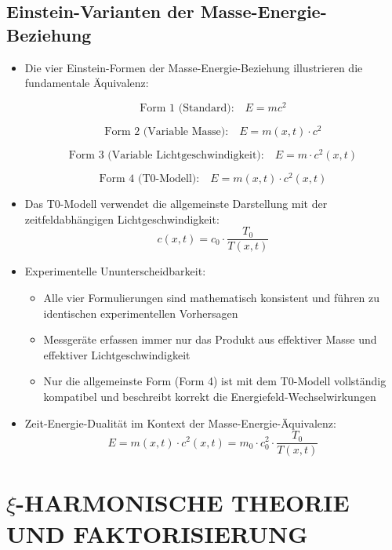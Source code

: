 \documentclass[12pt,a4paper]{article}
\begin{document}
	\subsection{Einstein-Varianten der Masse-Energie-Beziehung}
	\begin{itemize}
		\item Die vier Einstein-Formen der Masse-Energie-Beziehung illustrieren die fundamentale \"{A}quivalenz:
		
		$$\text{Form 1 (Standard):} \quad \boxed{E = mc^2}$$
		
		$$\text{Form 2 (Variable Masse):} \quad \boxed{E = m(x,t) \cdot c^2}$$
		
		$$\text{Form 3 (Variable Lichtgeschwindigkeit):} \quad \boxed{E = m \cdot c^2(x,t)}$$
		
		$$\text{Form 4 (T0-Modell):} \quad \boxed{E = m(x,t) \cdot c^2(x,t)}$$
		
		\item Das T0-Modell verwendet die allgemeinste Darstellung mit der zeitfeldabh\"{a}ngigen Lichtgeschwindigkeit:
		$$c(x,t) = c_0 \cdot \frac{T_0}{T(x,t)}$$
		
		\item Experimentelle Ununterscheidbarkeit:
		\begin{itemize}
			\item Alle vier Formulierungen sind mathematisch konsistent und f\"{u}hren zu identischen experimentellen Vorhersagen
			\item Messger\"{a}te erfassen immer nur das Produkt aus effektiver Masse und effektiver Lichtgeschwindigkeit
			\item Nur die allgemeinste Form (Form 4) ist mit dem T0-Modell vollst\"{a}ndig kompatibel und beschreibt korrekt die Energiefeld-Wechselwirkungen
		\end{itemize}
		
		\item Zeit-Energie-Dualit\"{a}t im Kontext der Masse-Energie-\"{A}quivalenz:
		$$E = m(x,t) \cdot c^2(x,t) = m_0 \cdot c_0^2 \cdot \frac{T_0}{T(x,t)}$$
	\end{itemize}
	
	\section{$\xi$-HARMONISCHE THEORIE UND FAKTORISIERUNG}
	
\end{document}
